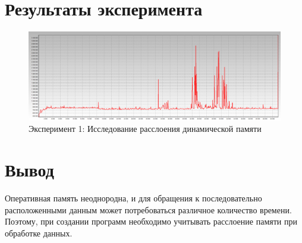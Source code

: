 \section{Результаты эксперимента}
\begin{figure}[ht!]
    \centering
    \includegraphics[width=170mm]{./img/task_01.png}
    \caption{Эксперимент 1: Исследование расслоения динамической памяти\label{overflow}}
\end{figure}

\section{Вывод}
Оперативная память неоднородна, и для обращения к последовательно расположенными данным может потребоваться различное количество
времени. Поэтому, при создании программ необходимо учитывать расслоение памяти при обработке данных.